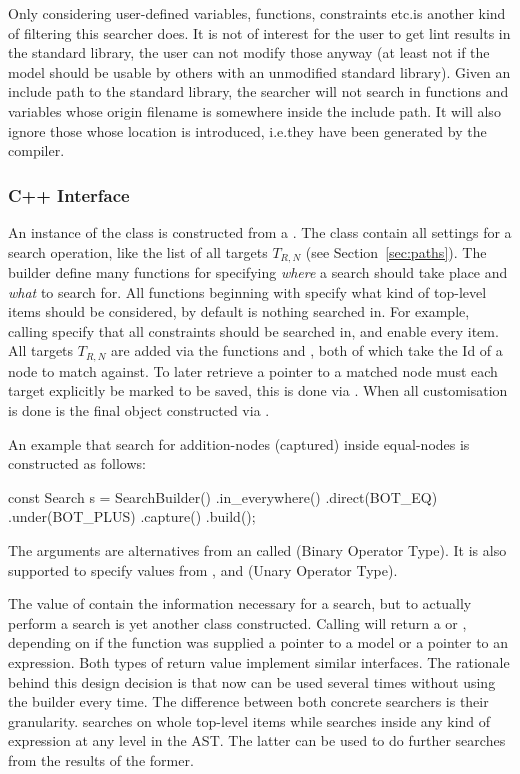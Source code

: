 \documentclass[a4paper,12pt]{article}
\begin{document}
Only considering user-defined variables, functions, constraints etc.\@ is another kind of
filtering this searcher does. It is not of interest for the user to get lint results in
the standard library, the user can not modify those anyway (at least not if the model should
be usable by others with an unmodified standard library). Given an include path to the
standard library, the searcher will not search in functions and variables whose origin
filename is somewhere inside the include path. It will also ignore those whose location is
introduced, i.e.\@ they have been generated by the compiler.

\subsubsection{C++ Interface}
\sloppy %

An instance of the  class is constructed from a . The
 class contain all settings for a search operation, like the list of all
targets $T_{R,N}$ (see Section~\ref{sec:paths}). The
builder define many functions for specifying \emph{where} a search should take place and
\emph{what} to search for. All functions beginning with  specify what kind of
top-level items should be considered, by default is nothing searched in. For example, calling
 specify that all constraints should be searched in, and
 enable every item.
All targets $T_{R,N}$ are added via the functions  and , both of
which take the Id of a node to match against. To later
retrieve a pointer to a matched node must each target explicitly be marked to
be saved, this is done via . When all
customisation is done is the final object constructed via .

An example that search for addition-nodes (captured) inside equal-nodes is constructed as follows:
\begin{cppp}[style=nonumbers]
const Search s = SearchBuilder()
  .in_everywhere()
  .direct(BOT_EQ)
  .under(BOT_PLUS)
  .capture()
  .build();
\end{cppp}
The arguments are alternatives from an  called  (Binary Operator Type).
It is also supported to specify values from , and  (Unary
Operator Type).

The value of  contain the information necessary for a search, but to actually
perform a search is yet another class constructed. Calling  will return a
 or , depending on if the function was supplied
a pointer to a model or a pointer to an expression. Both types of return value implement
similar interfaces.
The rationale behind this design
decision is that  now can be used several times
without using the builder every time.
The difference between both concrete searchers is their granularity. 
searches on whole top-level items while  searches inside any kind
of expression at any level in the AST. The latter can be used to do further searches from
the results of the former.
\end{document}
